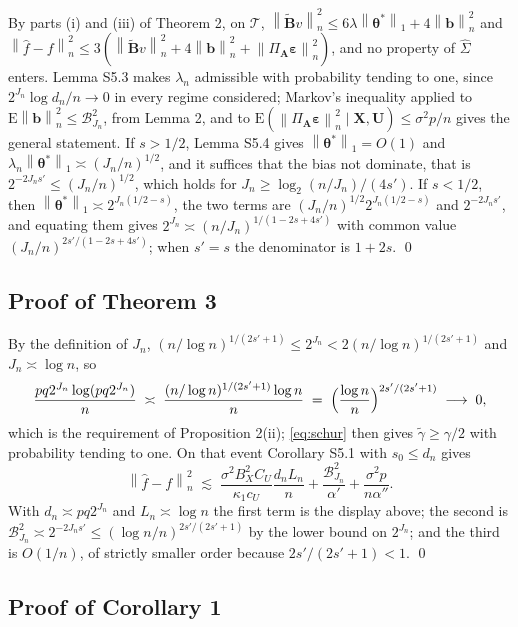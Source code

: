 \documentclass[10pt]{book}
\theoremstyle{definition}
\newcommand{\E}{\mathrm{E}}
\newcommand{\norm}[1]{\left\lVert #1 \right\rVert}
\newcommand{\normn}[1]{\left\lVert #1 \right\rVert_{n}}
\newcommand{\bX}{\mathbf{X}}
\newcommand{\bU}{\mathbf{U}}
\newcommand{\btheta}{\boldsymbol{\theta}}
\newcommand{\thetastar}{\btheta^{*}}
\newcommand{\Gramhat}{\widehat{\Sigma}}
\newcommand{\pen}{\lambda}
\newcommand{\penn}{\lambda_{n}}
\newcommand{\seff}{s'}
\newcommand{\Amat}{\mathbf{A}}
\newcommand{\Bmat}{\mathbf{B}}
\newcommand{\Btil}{\widetilde{\Bmat}}
\newcommand{\PA}{\Pi_{\Amat}}
\newcommand{\bveps}{\boldsymbol{\varepsilon}}
\newcommand{\bb}{\mathbf{b}}
\newcommand{\gtil}{\widetilde{\gamma}}
\begin{document}
By parts (i) and (iii) of Theorem 2, on $\mathcal{T}$,
$\normn{\Btil v}^2 \le 6\pen\norm{\thetastar}_1+4\normn{\bb}^2$ and
$\normn{\widehat{f}-f}^2 \le 3(\normn{\Btil v}^2+4\normn{\bb}^2+
\normn{\PA\bveps}^2)$, and no property of $\Gramhat$ enters. Lemma S5.3 makes
$\penn$ admissible with probability tending to one, since
$2^{J_n}\log d_n/n \to 0$ in every regime considered; Markov's inequality
applied to $\E\normn{\bb}^2 \le \mathcal{B}^2_{J_n}$, from Lemma 2, and to
$\E(\normn{\PA\bveps}^2\mid\bX,\bU) \le \sigma^2p/n$ gives the general
statement. If $s>1/2$, Lemma S5.4 gives $\norm{\thetastar}_1 = O(1)$ and
$\penn\norm{\thetastar}_1 \asymp (J_n/n)^{1/2}$, and it suffices that the bias
not dominate, that is $2^{-2J_n\seff} \le (J_n/n)^{1/2}$, which holds for
$J_n \ge \log_2(n/J_n)/(4\seff)$. If $s<1/2$, then
$\norm{\thetastar}_1 \asymp 2^{J_n(1/2-s)}$, the two terms are
$(J_n/n)^{1/2}2^{J_n(1/2-s)}$ and $2^{-2J_n\seff}$, and equating them gives
$2^{J_n} \asymp (n/J_n)^{1/(1-2s+4\seff)}$ with common value
$(J_n/n)^{2\seff/(1-2s+4\seff)}$; when $\seff = s$ the denominator is
$1+2s$. \qed

\subsection*{Proof of Theorem 3}

By the definition of $J_n$,
$(n/\log n)^{1/(2\seff+1)} \le 2^{J_n} < 2(n/\log n)^{1/(2\seff+1)}$ and
$J_n \asymp \log n$, so
\[
  \frac{pq2^{J_n}\log(pq2^{J_n})}{n}
  \;\asymp\; \frac{(n/\log n)^{1/(2\seff+1)}\log n}{n}
  \;=\; \Bigl(\frac{\log n}{n}\Bigr)^{2\seff/(2\seff+1)}
  \;\longrightarrow\; 0,
\]
which is the requirement of Proposition 2(ii); \eqref{eq:schur} then gives
$\gtil \ge \gamma/2$ with probability tending to one. On that event
Corollary S5.1 with $s_0 \le d_n$ gives
\[
  \normn{\widehat{f}-f}^2 \;\lesssim\;
  \frac{\sigma^2B_X^2C_U}{\kappa_1c_U}\frac{d_nL_n}{n}
  + \frac{\mathcal{B}^2_{J_n}}{\alpha'} + \frac{\sigma^2p}{n\alpha''} .
\]
With $d_n \asymp pq2^{J_n}$ and $L_n \asymp \log n$ the first term is the
display above; the second is
$\mathcal{B}^2_{J_n} \asymp 2^{-2J_n\seff} \le
(\log n/n)^{2\seff/(2\seff+1)}$ by the lower bound on $2^{J_n}$; and the third
is $O(1/n)$, of strictly smaller order because $2\seff/(2\seff+1)<1$. \qed

\subsection*{Proof of Corollary 1}
\end{document}
